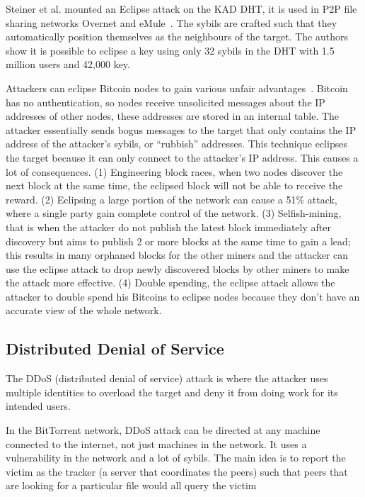 Steiner et al. mounted an Eclipse attack on the KAD DHT, it is used in P2P file
sharing networks Overnet and eMule~\cite{steiner2007exploiting}. The sybils are
crafted such that they automatically position themselves as the neighbours of
the target. The authors show it is possible to eclipse a key using only 32
sybils in the DHT with 1.5 million users and 42,000 key.

Attackers can eclipse Bitcoin nodes to gain various unfair
advantages~\cite{heilman2015eclipse}. Bitcoin has no authentication, so nodes
receive unsolicited messages about the IP addresses of other nodes, these
addresses are stored in an internal table. The attacker essentially sends bogus
messages to the target that only contains the IP address of the attacker's
sybils, or ``rubbish'' addresses. This technique eclipses the target because it
can only connect to the attacker's IP address. This causes a lot of
consequences. (1) Engineering block races, when two nodes discover the next
block at the same time, the eclipsed block will not be able to receive the
reward. (2) Eclipsing a large portion of the network can cause a 51\% attack,
where a single party gain complete control of the network. (3) Selfish-mining,
that is when the attacker do not publish the latest block immediately after
discovery but aims to publish 2 or more blocks at the same time to gain a lead;
this results in many orphaned blocks for the other miners and the attacker can
use the eclipse attack to drop newly discovered blocks by other miners to make
the attack more effective. (4) Double spending, the eclipse attack allows the
attacker to double spend his Bitcoins to eclipse nodes because they don't have
an accurate view of the whole network.

\subsection{Distributed Denial of Service}
The DDoS (distributed denial of service) attack is where the attacker uses
multiple identities to overload the target and deny it from doing work for its
intended users.

In the BitTorrent network, DDoS attack can be directed at any machine connected
to the internet, not just machines in the network. It uses a vulnerability in
the network and a lot of sybils. The main idea is to report the victim as the
tracker (a server that coordinates the peers) such that peers that are looking
for a particular file would all query the victim~\cite{sia2006ddos}

